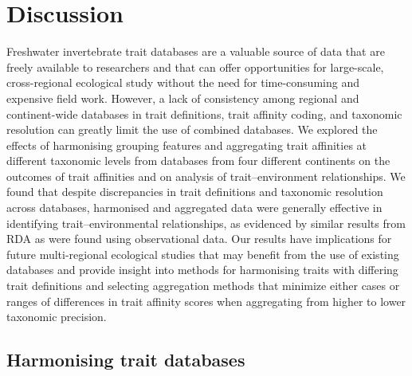 \documentclass[12pt]{article}
\begin{document}
\newpage


\section*{Discussion}

Freshwater invertebrate trait databases are a valuable source of data that are freely available to researchers and that can offer opportunities for large-scale, cross-regional ecological study without the need for time-consuming and expensive field work. However, a lack of consistency among regional and continent-wide databases in trait definitions, trait affinity coding, and taxonomic resolution can greatly limit the use of combined databases. We explored the effects of harmonising grouping features and aggregating trait affinities at different taxonomic levels from databases from four different continents on the outcomes of trait affinities and on analysis of trait–environment relationships. We found that despite discrepancies in trait definitions and taxonomic resolution across databases, harmonised and aggregated data were generally effective in identifying trait–environmental relationships, as evidenced by similar results from RDA as were found using observational data. Our results have implications for future multi-regional ecological studies that may benefit from the use of existing databases and provide insight into methods for harmonising traits with differing trait definitions and selecting aggregation methods that minimize either cases or ranges of differences in trait affinity scores when aggregating from higher to lower taxonomic precision.

\subsection*{Harmonising trait databases}
\end{document}

